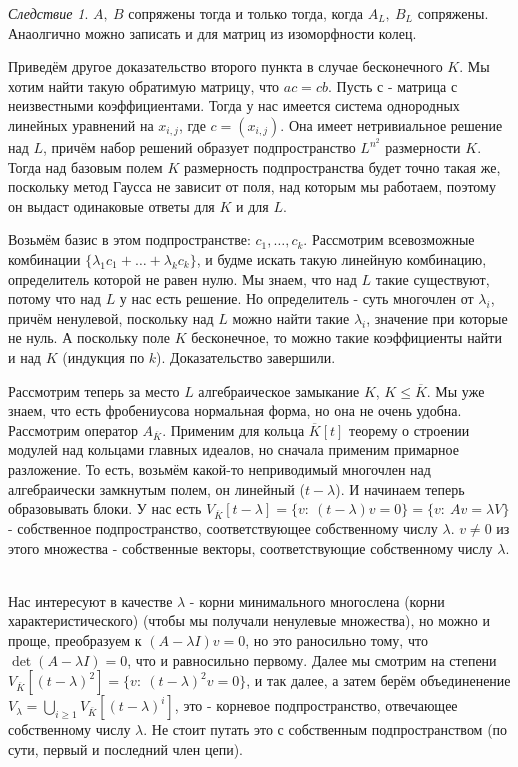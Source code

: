 \documentclass[a4paper,100pt]{article}
\theoremstyle{indented}
\theoremstyle{definition}
\theoremstyle{remark}
\newtheorem{cons}{Следствие}
\begin{document}
\begin{cons}
    $A,\: B$ сопряжены тогда и только тогда, когда $A_L, \: B_L$ сопряжены. Анаолгично можно записать и для матриц из изоморфности колец.
\end{cons}

Приведём другое доказательство второго пункта в случае бесконечного $K$. Мы хотим найти такую обратимую матрицу, что $ac=cb$. Пусть $с$ - матрица с неизвестными коэффициентами. Тогда у нас имеется система однородных линейных уравнений на $x_{i, j}$, где $c=(x_{i,j})$. Она имеет нетривиальное решение над $L$, причём набор решений образует подпространство $L^{n^2}$ размерности $K$. Тогда над базовым полем $K$ размерность подпространства будет точно такая же, поскольку метод Гаусса не зависит от поля, над которым мы работаем, поэтому он выдаст одинаковые ответы для $K$ и для $L$. \ 

Возьмём базис в этом подпространстве: $c_1, \ldots, c_k$. Рассмотрим всевозможные комбинации $\{\lambda_1c_1+\ldots+\lambda_kc_k\}$, и будме искать такую линейную комбинацию, определитель которой не равен нулю. Мы знаем, что над $L$ такие существуют, потому что над $L$ у нас есть решение. Но определитель - суть многочлен от $\lambda_i$, причём ненулевой, поскольку над $L$ можно найти такие $\lambda_i$, значение при которые не нуль. А поскольку поле $K$ бесконечное, то можно такие коэффициенты найти и над $K$ (индукция по $k$). Доказательство завершили.

Рассмотрим теперь за место $L$ алгебраическое замыкание $K$, $K\leq \overline{K}$. Мы уже знаем, что есть фробениусова нормальная форма, но она не очень удобна. Рассмотрим оператор $A_{\overline{K}}$. Применим для кольца $\overline{K}[t]$ теорему о строении модулей над кольцами главных идеалов, но сначала применим примарное разложение. То есть, возьмём какой-то неприводимый многочлен над алгебраически замкнутым полем, он линейный ($t-\lambda$). И начинаем теперь образовывать блоки. У нас есть $V_{\overline{K}}[t-\lambda]= \{v:\: (t-\lambda)v=0\}=\{v: \: Av=\lambda V\}$ - собственное подпространство, соответствующее собственному числу $\lambda$. $v\neq 0$ из этого множества - собственные векторы, соответствующие собственному числу $\lambda$. \ 

Нас интересуют в качестве $\lambda$ - корни минимального многослена (корни характеристического) (чтобы мы получали ненулевые множества), но можно и проще, преобразуем к $(A-\lambda I)v=0$, но это раносильно тому, что $\det(A-\lambda I)=0$, что и равносильно первому. Далее мы смотрим на степени $V_{\overline{K}}[(t-\lambda)^2]=\{v:\: (t-\lambda)^2v=0\}$, и так далее, а затем берём объединенение $V_\lambda=\bigcup_{i\geq 1}V_{\overline{K}}[(t-\lambda)^i]$, это - корневое подпространство, отвечающее собственному числу $\lambda$. Не стоит путать это с собственным подпространством (по сути, первый и последний член цепи). \ 
\end{document}
